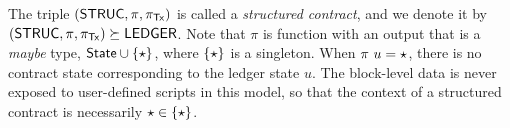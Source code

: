 The triple $(\mathsf{STRUC}, \pi, \pi_{\mathsf{Tx}})$ is called a \emph{structured
contract}, and we denote it by $(\mathsf{STRUC}, \pi, \pi_{\mathsf{Tx}}) \succeq \mathsf{LEDGER}$.
Note that $\pi$ is function with an output that is a \emph{maybe} type, 
$\mathsf{State} \cup \{\star\}$, where $\{\star\}$ is a
singleton. When $\pi~u = \star$, there is no
contract state corresponding to the ledger state $u$.
The block-level data is never exposed to user-defined scripts in this model,
so that the context of a structured contract is necessarily $\star \in \{\star\}$.
